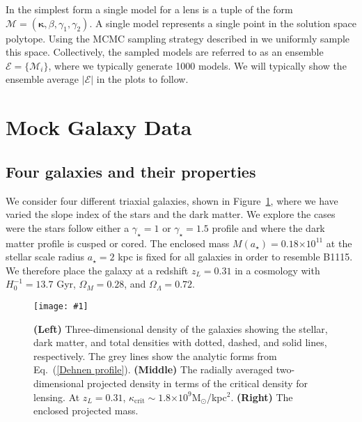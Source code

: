 \documentclass[onecolumn,galley]{mn2e}
\newcommand{\M}{\ensuremath{\mathscr{M}}}
\newcommand{\E}{\ensuremath{\mathscr{E}}}
\newcommand{\Msun}{\ensuremath{\mathrm{M}_\odot}}
\newcommand{\figref}[1] {Figure~\ref{#1}}
\newcommand{\eqnref}[1] {Eq.~(\ref{#1})}
\newcommand{\e}[1]{\ensuremath{\times 10^{#1}}}
\renewcommand{\vec}[1]{\ensuremath{\boldsymbol{#1}}}
\newcommand\plotone[1]{%
 \centering
 \leavevmode
 \texttt{[image: \#1]}%
}%
\begin{document}
In the simplest form a single model for a lens is a tuple of the form
$\M = (\vec\kappa, \beta, \gamma_1, \gamma_2)$. A single model represents a 
single point in the solution space polytope. Using the MCMC sampling strategy
described in \cite{} we uniformly sample this space. Collectively, the sampled
models are referred to as an ensemble $\E = \{\M_i\}$, where we typically
generate 1000 models. We will typically show the ensemble average $|\E|$ in the
plots to follow.



\section{Mock Galaxy Data}

\subsection{Four galaxies and their properties} %

We consider four different triaxial galaxies, shown in \figref{test galaxies},
where we have varied the slope index of the stars and the dark matter. We
explore the cases were the stars follow either a $\gamma_\star=1$ or
$\gamma_\star=1.5$ profile and where the dark matter profile is cusped or
cored. The enclosed mass $M(a_\star)= 0.18\e{11}$ at the stellar scale
radius $a_\star=2$ kpc is fixed for all galaxies in order to resemble B1115. We
therefore place the galaxy at a redshift $z_L = 0.31$ in a cosmology with
$H_0^{-1}=13.7$ Gyr, $\Omega_M=0.28$, and $\Omega_\Lambda=0.72$.

\begin{figure}
\plotone{cmp_simulations.pdf}
\caption{
\textbf{(Left)} 
Three-dimensional density of the galaxies showing the stellar, dark matter,
and total densities with dotted, dashed, and solid lines, respectively. The
grey lines show the analytic forms from \eqnref{Dehnen profile}. 
\textbf{(Middle)} 
The radially averaged two-dimensional projected density in terms of the
critical density for lensing. At $z_L=0.31$, $\kappa_\mathrm{crit}\sim 1.8\e{9}$\Msun/kpc$^2$.
\textbf{(Right)}
The enclosed projected mass.
}
\label{test galaxies}
\end{figure}
\end{document}
